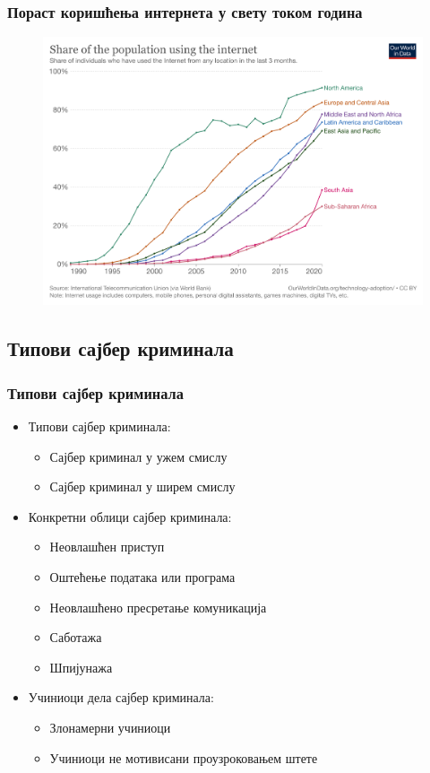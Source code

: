 \documentclass{beamer}
\begin{document}
\begin{frame}\frametitle{Пораст коришћења интернета у свету током година}
  \begin{figure}[h]
  \centering
  \includegraphics[width=1.0\textwidth]{koriscenje-interneta-po-godinama.png}
  \end{figure}
\end{frame}

\subsection{Типови сајбер криминала}

\begin{frame}\frametitle{Типови сајбер криминала}
	\begin{itemize}
		\item Типови сајбер криминала:
		\begin{itemize}
			\item Сајбер криминал у ужем смислу
			\item Сајбер криминал у ширем смислу
		\end{itemize}
		\item Конкретни облици сајбер криминала:
		\begin{itemize}
			\item Неовлашћен приступ
			\item Оштећење података или програма
			\item Неовлашћено пресретање комуникација
			\item Саботажа
			\item Шпијунажа
		\end{itemize}
		\item Учиниоци дела сајбер криминала:
		\begin{itemize}
			\item Злонамерни учиниоци
			\item Учиниоци не мотивисани проузроковањем штете
		\end{itemize}
	\end{itemize}  
\end{frame}
\end{document}
